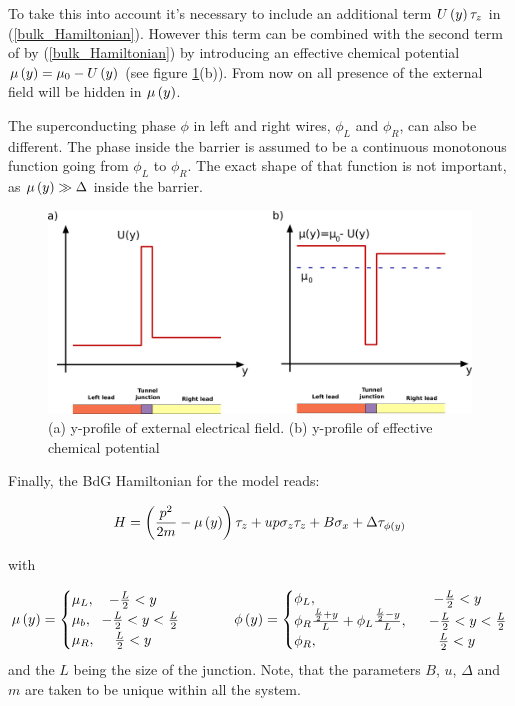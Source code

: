 To take this into account it's necessary to include an additional term $ U \left(y\right)\tau_z $ in (\ref{bulk_Hamiltonian}). However this term can be combined with the second term of  by (\ref{bulk_Hamiltonian}) by introducing an effective chemical potential $ \mu \left(y\right) = \mu_0 - U\left(y\right)  $ (see figure \ref{fig:chemandextpotentials}(b)). From now on all presence of  the external field will be hidden in $ \mu\left(y\right) $.

The superconducting phase $ \phi $ in left and right wires, $ \phi_L $ and $ \phi_R $, can also be different. The phase inside the barrier is assumed to be a continuous monotonous function going from $ \phi_L $ to $ \phi_R $. The exact shape of that function is not important, as $ \mu\left(y\right) \gg \Delta$ inside the   
barrier.



\begin{figure}[H]
	\centering
	\includegraphics[width=0.8\linewidth]{images/chem_and_ext_potentials}
	\caption{(a) y-profile of external electrical field.  (b) y-profile of effective chemical potential}
	\label{fig:chemandextpotentials}
\end{figure}


Finally, the BdG Hamiltonian for the model reads:

\begin{equation}
H
=
\left(
	\frac{p^2}{2m}
	-\mu\left(y\right)
\right)\tau_z
+
u p \sigma_z \tau_z
+
B\sigma_x	
+
\Delta\tau_{\phi\left(y\right)}
\end{equation}

with

\begin{equation}
	\mu\left(y\right)
	=
	\begin{cases}
		\mu_L,~~~  -\frac{L}{2}<y\\
		\mu_b,~~ -\frac{L}{2} <y <\frac{L}{2}\\
		\mu_R, ~~~~ \frac{L}{2}< y  
	\end{cases}
	~~~~~~~~
	\phi\left(y\right)
	=
	\begin{cases}
		\phi_L,&~~~  -\frac{L}{2}<y\\
		\phi_R
		\frac{\frac{L}{2}+y}{L}
		+
		\phi_L
		\frac{\frac{L}{2}-y}{L},
		&~~ -\frac{L}{2} <y <\frac{L}{2}\\
		\phi_R, &~~~~ \frac{L}{2}< y 
	\end{cases}
\end{equation}
and the $ L $ being the size of the junction. Note, that the parameters $ B $, $ u $, $ \Delta $ and $ m $ are taken to be unique within all the system.
 
